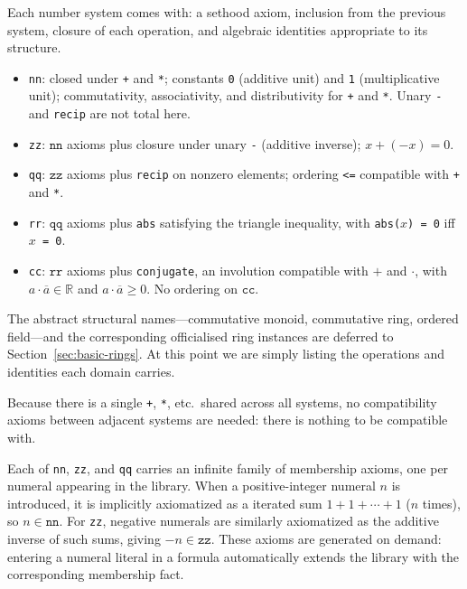 Each number system comes with: a sethood axiom, inclusion from the
previous system, closure of each operation, and algebraic identities
appropriate to its structure.

\begin{itemize}
\item \texttt{nn}: closed under \texttt{+} and \texttt{*}; constants
  \texttt{0} (additive unit) and \texttt{1} (multiplicative unit);
  commutativity, associativity, and distributivity for \texttt{+} and
  \texttt{*}.  Unary \texttt{-} and \texttt{recip} are not total here.
\item \texttt{zz}: $\mathtt{nn}$ axioms plus closure under unary
  \texttt{-} (additive inverse); $x + (-x) = 0$.
\item \texttt{qq}: $\mathtt{zz}$ axioms plus \texttt{recip} on nonzero
  elements; ordering \texttt{<=} compatible with \texttt{+} and \texttt{*}.
\item \texttt{rr}: $\mathtt{qq}$ axioms plus \texttt{abs} satisfying the
  triangle inequality, with \texttt{abs($x$) = 0} iff \texttt{$x$ = 0}.
\item \texttt{cc}: $\mathtt{rr}$ axioms plus \texttt{conjugate}, an
  involution compatible with $+$ and $\cdot$, with
  $a \cdot \overline{a} \in \mathbb{R}$ and $a \cdot \overline{a} \geq 0$.
  No ordering on $\mathtt{cc}$.
\end{itemize}

\noindent The abstract structural names---commutative monoid,
commutative ring, ordered field---and the corresponding officialised
ring instances are deferred to Section~\ref{sec:basic-rings}.  At this
point we are simply listing the operations and identities each
domain carries.

Because there is a single \texttt{+}, \texttt{*}, etc.\ shared across all
systems, no compatibility axioms between adjacent systems are needed:
there is nothing to be compatible with.

\begin{remark}
Each of \texttt{nn}, \texttt{zz}, and \texttt{qq} carries an infinite
family of membership axioms, one per numeral appearing in the library.
When a positive-integer numeral $n$ is introduced, it is implicitly
axiomatized as a iterated sum $1 + 1 + \cdots + 1$ ($n$ times), so
$n \in \mathtt{nn}$.  For \texttt{zz}, negative numerals are similarly
axiomatized as the additive inverse of such sums, giving $-n \in
\mathtt{zz}$.  These axioms are generated on demand: entering a numeral
literal in a formula automatically extends the library with the
corresponding membership fact.
\end{remark}

